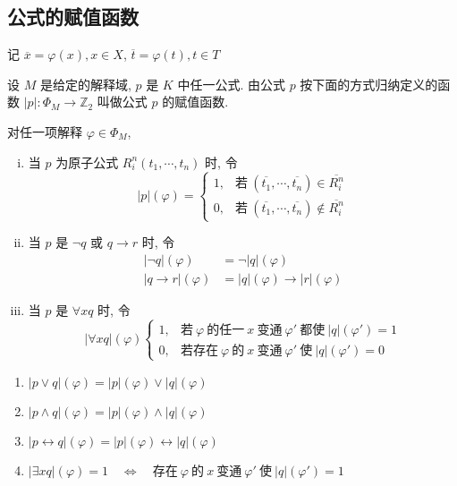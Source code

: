 \documentclass[
    mode=hazy,
    color=blue,
    device=normal,
    lang=cn
]{elegantnote}
\begin{document}
\subsection{公式的赋值函数}
记 $\overline{x}=\varphi(x), x\in X$, $\overline{t}=\varphi(t), t\in T$
\begin{definition}[公式的赋值函数]
    设 $M$ 是给定的解释域, $p$ 是 $K$ 中任一公式. 由公式 $p$ 按下面的方式归纳定义的函数 $\lvert p\rvert:\Phi_M\to\mathbb{Z}_2$ 叫做公式 $p$ 的赋值函数.

    对任一项解释 $\varphi\in\Phi_M$,
    \begin{enumerate}[(i)]
        \item 当 $p$ 为原子公式 $R_i^n(t_1, \cdots, t_n)$ 时, 令
        $$
            \lvert p\rvert (\varphi)=
            \begin{cases}
                1, &\text{若}\ (\overline{t_1}, \cdots, \overline{t_n})\in \overline{R_i^n}\\
                0, &\text{若}\ (\overline{t_1}, \cdots, \overline{t_n})\notin \overline{R_i^n}
            \end{cases}
        $$
        \item 当 $p$ 是 $\lnot q$ 或 $q\to r$ 时, 令
        \begin{align*}
            \lvert\lnot q\rvert(\varphi)&=\lnot\lvert q\rvert(\varphi)\\
            \lvert q\to r\rvert(\varphi) &= \lvert q\rvert(\varphi)\to\lvert r\rvert(\varphi)
        \end{align*}
        \item 当 $p$ 是 $\forall xq$ 时, 令
        $$
            \lvert\forall x q\rvert(\varphi)
            \begin{cases}
                1, &\text{若}\ \varphi\ \text{的任一}\ x\ \text{变通}\ \varphi'\ \text{都使}\ \lvert q\rvert(\varphi')=1\\
                0, &\text{若存在}\ \varphi\ \text{的}\ x\ \text{变通}\ \varphi'\ \text{使}\ \lvert q\rvert(\varphi')=0
            \end{cases}
        $$
    \end{enumerate}
\end{definition}
\begin{proposition}
    \hfill
    \begin{enumerate}[label = $\arabic*^\circ$]
        \item $\lvert p\lor q\rvert (\varphi) = \lvert p\rvert (\varphi)\lor \lvert q\rvert (\varphi)$
        \item $\lvert p\land q\rvert (\varphi) = \lvert p\rvert (\varphi)\land \lvert q\rvert (\varphi)$
        \item $\lvert p\leftrightarrow q\rvert (\varphi) = \lvert p\rvert (\varphi)\leftrightarrow \lvert q\rvert (\varphi)$
        \item $\lvert \exists x q\rvert (\varphi) = 1\quad\Leftrightarrow\quad \text{存在}\ \varphi\ \text{的}\ x\ \text{变通}\ \varphi'\ \text{使}\ \lvert q\rvert(\varphi')=1$
    \end{enumerate}
\end{proposition}
\end{document}
